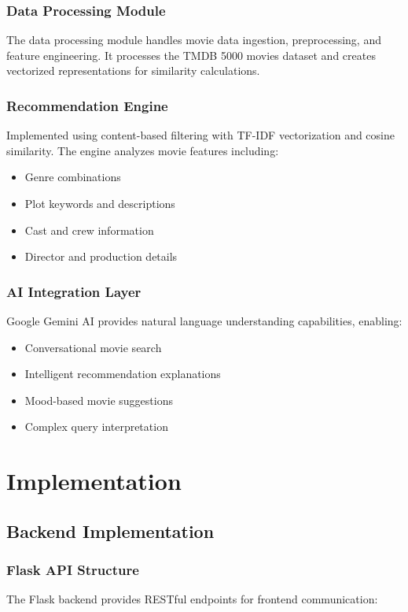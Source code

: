 \documentclass[12pt,a4paper]{article}
\begin{document}
\subsubsection{Data Processing Module}
The data processing module handles movie data ingestion, preprocessing, and feature engineering. It processes the TMDB 5000 movies dataset and creates vectorized representations for similarity calculations.

\subsubsection{Recommendation Engine}
Implemented using content-based filtering with TF-IDF vectorization and cosine similarity. The engine analyzes movie features including:
\begin{itemize}
    \item Genre combinations
    \item Plot keywords and descriptions
    \item Cast and crew information
    \item Director and production details
\end{itemize}

\subsubsection{AI Integration Layer}
Google Gemini AI provides natural language understanding capabilities, enabling:
\begin{itemize}
    \item Conversational movie search
    \item Intelligent recommendation explanations
    \item Mood-based movie suggestions
    \item Complex query interpretation
\end{itemize}

\section{Implementation}

\subsection{Backend Implementation}

\subsubsection{Flask API Structure}
The Flask backend provides RESTful endpoints for frontend communication:
\end{document}
